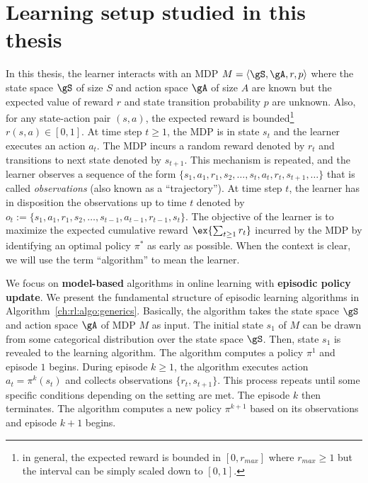 
\section{Learning setup studied in this thesis}
\label{sec:intro_learning}

In this thesis, the learner interacts with an MDP $M=\langle\gS,\gA,r,p\rangle$ where the state space $\gS$ of size $S$ and action space $\gA$ of size $A$ are known but the expected value of reward $r$ and state transition probability $p$ are unknown.
Also, for any state-action pair $(s,a)$, the expected reward is bounded\footnote{in general, the expected reward is bounded in $[0, r_{max}]$ where $r_{max}\ge1$ but the interval can be simply scaled down to $[0,1]$.} $r(s,a)\in[0,1]$.
At time step $t\ge1$, the MDP is in state $s_t$ and the learner executes an action $a_t$.
The MDP incurs a random reward denoted by $r_t$ and transitions to next state denoted by $s_{t+1}$.
This mechanism is repeated, and the learner observes a sequence of the form $\{s_1,a_1,r_1,s_2,\dots,s_t,a_t,r_t,s_{t+1},\dots\}$ that is called \emph{observations} (also known as a ``trajectory'').
At time step $t$, the learner has in disposition the observations up to time $t$ denoted by $o_t:=\{s_1,a_1,r_1,s_2,\dots,s_{t-1},a_{t-1},r_{t-1},s_{t}\}$.
The objective of the learner is to maximize the expected cumulative reward $\ex{\sum_{t\ge1}r_t}$ incurred by the MDP by identifying an optimal policy $\pi^*$ as early as possible.
When the context is clear, we will use the term ``algorithm'' to mean the learner.

We focus on \textbf{model-based} algorithms in online learning with \textbf{episodic policy update}.
We present the fundamental structure of episodic learning algorithms in Algorithm~\ref{ch:rl:algo:generics}.
Basically, the algorithm takes the state space $\gS$ and action space $\gA$ of MDP $M$ as input.
The initial state $s_1$ of $M$ can be drawn from some categorical distribution over the state space $\gS$.
Then, state $s_1$ is revealed to the learning algorithm.
The algorithm computes a policy $\pi^1$ and episode $1$ begins.
During episode $k\ge1$, the algorithm executes action $a_t=\pi^k(s_t)$ and collects observations $\{r_t, s_{t+1}\}$.
This process repeats until some specific conditions depending on the setting are met.
The episode $k$ then terminates.
The algorithm computes a new policy $\pi^{k+1}$ based on its observations and episode $k+1$ begins.


